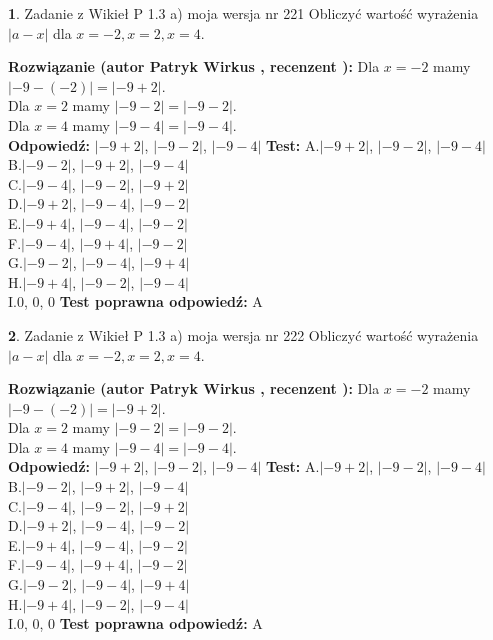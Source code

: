 \documentclass[12pt, a4paper]{article}
\theoremstyle{definition} %
\newtheorem{zad}{}
\newcommand{\zadStart}[1]{\begin{zad}#1\newline}
\newcommand{\zadStop}{\end{zad}}
\newcommand{\rozwStart}[2]{\noindent \textbf{Rozwiązanie (autor #1 , recenzent #2): }\newline}
\newcommand{\rozwStop}{\newline}
\newcommand{\odpStart}{\noindent \textbf{Odpowiedź:}\newline}
\newcommand{\odpStop}{\newline}
\newcommand{\testStart}{\noindent \textbf{Test:}\newline}
\newcommand{\testStop}{\newline}
\newcommand{\kluczStart}{\noindent \textbf{Test poprawna odpowiedź:}\newline}
\newcommand{\kluczStop}{\newline}
\begin{document}
\zadStart{Zadanie z Wikieł P 1.3 a) moja wersja nr 221}
Obliczyć wartość wyrażenia $|a - x|$ dla $x=-2,x=2,x=4$.
\zadStop
\rozwStart{Patryk Wirkus}{}
Dla $x = -2$ mamy $|-9 - (-2)| = |-9 + 2|$.\\
Dla $x = 2$ mamy $|-9 - 2| = |-9 - 2|$.\\
Dla $x = 4$ mamy $|-9 - 4| = |-9 - 4|$.\\
\rozwStop
\odpStart
$|-9 + 2|$, $|-9 - 2|$, $|-9 - 4|$
\odpStop
\testStart
A.$|-9 + 2|$, $|-9 - 2|$, $|-9 - 4|$\\
B.$|-9 - 2|$, $|-9 + 2|$, $|-9 - 4|$\\
C.$|-9 - 4|$, $|-9 - 2|$, $|-9 + 2|$\\
D.$|-9 + 2|$, $|-9 - 4|$, $|-9 - 2|$\\
E.$|-9 + 4|$, $|-9 - 4|$, $|-9 - 2|$\\
F.$|-9 - 4|$, $|-9 + 4|$, $|-9 - 2|$\\
G.$|-9 - 2|$, $|-9 - 4|$, $|-9 + 4|$\\
H.$|-9 + 4|$, $|-9 - 2|$, $|-9 - 4|$\\
I.$0$, $0$, $0$
\testStop
\kluczStart
A
\kluczStop



\zadStart{Zadanie z Wikieł P 1.3 a) moja wersja nr 222}
Obliczyć wartość wyrażenia $|a - x|$ dla $x=-2,x=2,x=4$.
\zadStop
\rozwStart{Patryk Wirkus}{}
Dla $x = -2$ mamy $|-9 - (-2)| = |-9 + 2|$.\\
Dla $x = 2$ mamy $|-9 - 2| = |-9 - 2|$.\\
Dla $x = 4$ mamy $|-9 - 4| = |-9 - 4|$.\\
\rozwStop
\odpStart
$|-9 + 2|$, $|-9 - 2|$, $|-9 - 4|$
\odpStop
\testStart
A.$|-9 + 2|$, $|-9 - 2|$, $|-9 - 4|$\\
B.$|-9 - 2|$, $|-9 + 2|$, $|-9 - 4|$\\
C.$|-9 - 4|$, $|-9 - 2|$, $|-9 + 2|$\\
D.$|-9 + 2|$, $|-9 - 4|$, $|-9 - 2|$\\
E.$|-9 + 4|$, $|-9 - 4|$, $|-9 - 2|$\\
F.$|-9 - 4|$, $|-9 + 4|$, $|-9 - 2|$\\
G.$|-9 - 2|$, $|-9 - 4|$, $|-9 + 4|$\\
H.$|-9 + 4|$, $|-9 - 2|$, $|-9 - 4|$\\
I.$0$, $0$, $0$
\testStop
\kluczStart
A
\kluczStop
\end{document}
